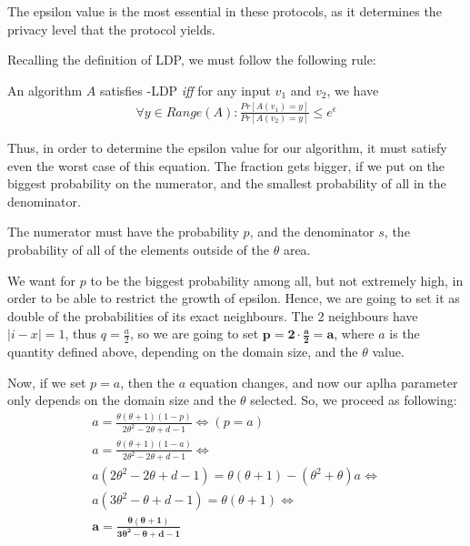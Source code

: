 The epsilon value is the most essential in these protocols, as it determines the privacy level that the protocol yields.

Recalling the definition of LDP, we must follow the following rule:

\begin{center}
An algorithm $A$ satisfies \espilon-LDP \textit{iff} for any input $v_1$ and $v_2$, we have
\begin{align*}
    \forall y \in Range(A): \frac{Pr[A(v_1) = y]}{Pr[A(v_2) = y]} \leq e^{\epsilon}
\end{align*}
    
\end{center}

Thus, in order to determine the epsilon value for our algorithm, it must satisfy even the worst case of this equation. The fraction gets bigger, if we put on the biggest probability on the numerator, and the smallest probability of all in the denominator. 

The numerator must have the probability $p$, and the denominator $s$, the probability of all of the elements outside of the $\theta$ area. 

We want for $p$ to be the biggest probability among all, but not extremely high, in order to be able to restrict the growth of epsilon. Hence, we are going to set it as double of the probabilities of its exact neighbours. The 2 neighbours have $|i-x| = 1$, thus $q = \frac{a}{2}$, so we are going to set $\mathbf{p = 2 \cdot \frac{a}{2} = a}$, where $a$ is the quantity defined above, depending on the domain size, and the $\theta$ value.

Now, if we set $p = a$, then the $a$ equation changes, and now our aplha parameter only depends on the domain size and the $\theta$ selected. So, we proceed as following:
\begin{align*}
    a = \frac{\theta(\theta + 1) (1 - p)}{2\theta^2 - 2\theta + d - 1} \Longleftrightarrow{(p = a)}\\
    a = \frac{\theta(\theta + 1) (1 - a)}{2\theta^2 - 2\theta + d - 1} \Longleftrightarrow \\
    a (2\theta^2 - 2\theta + d - 1) = \theta(\theta + 1) - (\theta^2 + \theta)a \Longleftrightarrow\\
    a (3\theta^2 - \theta + d - 1) = \theta(\theta + 1) \Longleftrightarrow \\
    \mathbf{a = \frac{\theta(\theta + 1)}{3\theta^2 - \theta + d - 1}}
\end{align*}


